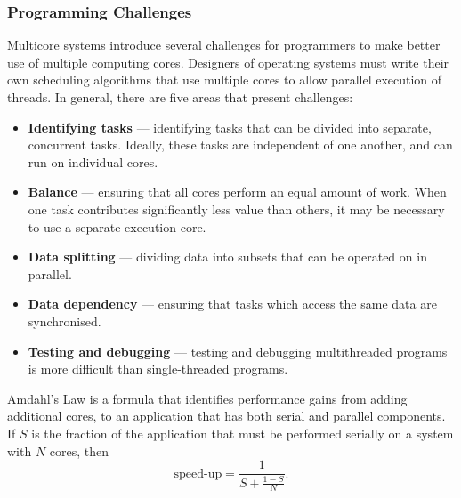 \documentclass{article}
\begin{document}
\subsubsection{Programming Challenges}
Multicore systems introduce several challenges for programmers to make
better use of multiple computing cores. Designers of operating systems
must write their own scheduling algorithms that use multiple cores to
allow parallel execution of threads. In general, there are five areas
that present challenges:
\begin{itemize}
    \item \textbf{Identifying tasks} --- identifying tasks that can be
          divided into separate, concurrent tasks. Ideally, these tasks
          are independent of one another, and can run on individual
          cores.
    \item \textbf{Balance} --- ensuring that all cores perform an equal
          amount of work. When one task contributes significantly less
          value than others, it may be necessary to use a separate
          execution core.
    \item \textbf{Data splitting} --- dividing data into subsets that
          can be operated on in parallel.
    \item \textbf{Data dependency} --- ensuring that tasks which access
          the same data are synchronised.
    \item \textbf{Testing and debugging} --- testing and debugging
          multithreaded programs is more difficult than single-threaded
          programs.
\end{itemize}
\begin{tcolorboxlarge}[title={Amdahl's Law}, parbox=false]
    Amdahl's Law is a formula that identifies performance gains from
    adding additional cores, to an application that has both serial
    and parallel components. If \(S\) is the fraction of the application
    that must be performed serially on a system with \(N\) cores, then
    \begin{equation*}
        \text{speed-up} = \frac{1}{S + \frac{1 - S}{N}}.
    \end{equation*}
\end{tcolorboxlarge}
\end{document}

